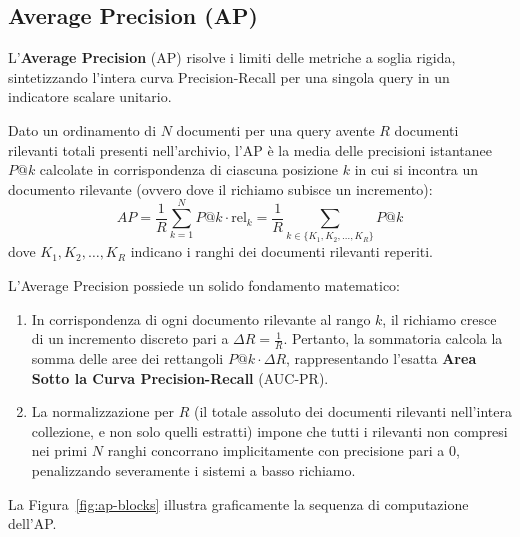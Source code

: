 \FloatBarrier
\subsection{Average Precision (AP)}
\label{subsec:average-precision-ap}

L'\textbf{Average Precision} (AP) risolve i limiti delle metriche a soglia rigida, sintetizzando l'intera curva Precision-Recall per una singola query in un indicatore scalare unitario.

\begin{definition}
Dato un ordinamento di $N$ documenti per una query avente $R$ documenti rilevanti totali presenti nell'archivio, l'AP \`e la media delle precisioni istantanee $P@k$ calcolate in corrispondenza di ciascuna posizione $k$ in cui si incontra un documento rilevante (ovvero dove il richiamo subisce un incremento):
\begin{equation}
AP = \frac{1}{R} \sum_{k=1}^N P@k \cdot \mathrm{rel}_k = \frac{1}{R} \sum_{k \in \{K_1, K_2, \dots, K_R\}} P@k
\end{equation}
dove $K_1, K_2, \dots, K_R$ indicano i ranghi dei documenti rilevanti reperiti.
\end{definition}

\begin{property}
L'Average Precision possiede un solido fondamento matematico:
\begin{enumerate}
    \item In corrispondenza di ogni documento rilevante al rango $k$, il richiamo cresce di un incremento discreto pari a $\Delta R = \frac{1}{R}$. Pertanto, la sommatoria calcola la somma delle aree dei rettangoli $P@k \cdot \Delta R$, rappresentando l'esatta \textbf{Area Sotto la Curva Precision-Recall} (AUC-PR).
    \item La normalizzazione per $R$ (il totale assoluto dei documenti rilevanti nell'intera collezione, e non solo quelli estratti) impone che tutti i rilevanti non compresi nei primi $N$ ranghi concorrano implicitamente con precisione pari a $0$, penalizzando severamente i sistemi a basso richiamo.
\end{enumerate}
\end{property}

La Figura~\ref{fig:ap-blocks} illustra graficamente la sequenza di computazione dell'AP.

